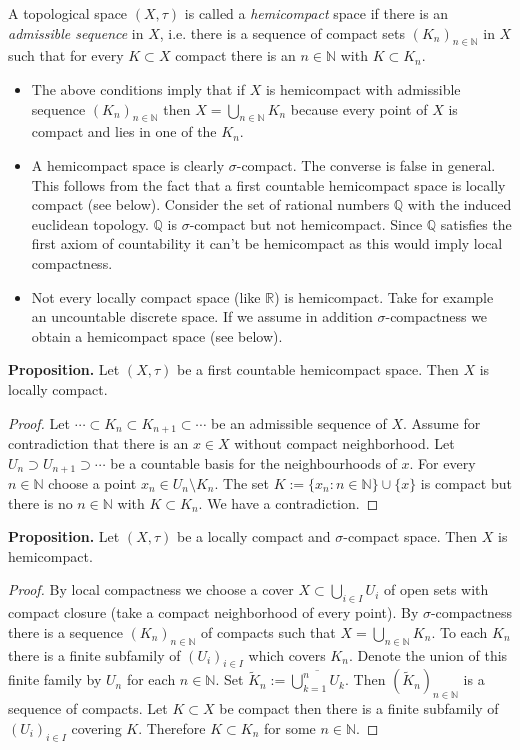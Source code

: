 \documentclass[12pt]{article}
\theoremstyle{definition}
\theoremstyle{plain}
\begin{document}
A topological space $(X, \tau)$ is called a \emph{hemicompact} space if there is an \emph{admissible sequence} in $X$, i.e. there is a sequence of compact sets $(K_n)_{n \in \mathbb{N}}$ in $X$ such that for every $K \subset X$ compact there is an $n \in \mathbb{N}$ with $K \subset K_n$.

\begin{itemize}
\item The above conditions imply that if $X$ is hemicompact with admissible sequence $(K_n)_{n \in \mathbb{N}}$ then $X = \bigcup_{n \in \mathbb{N}} K_n$ because every point of $X$ is compact and lies in one of the $K_n$.

\item A hemicompact space is clearly $\sigma$-compact. The converse is false in general. This follows from the fact that a first countable hemicompact space is locally compact (see below). Consider the set of rational numbers $\mathbb{Q}$ with the induced euclidean topology. $\mathbb{Q}$ is $\sigma$-compact but not hemicompact. Since $\mathbb{Q}$ satisfies the first axiom of countability it can't be hemicompact as this would imply local compactness.

\item Not every locally compact space (like $\mathbb{R}$) is hemicompact. Take for example an uncountable discrete space. If we assume in addition $\sigma$-compactness we obtain a hemicompact space (see below).
\end{itemize}

\textbf{Proposition.} Let $(X, \tau)$ be a first countable hemicompact space. Then $X$ is locally compact.

\begin{proof}
Let $\cdots \subset K_n \subset K_{n+1} \subset \cdots$ be an admissible sequence of $X$. 
Assume for contradiction that there is an $x \in X$ without compact neighborhood. Let $U_n \supset U_{n+1} \supset \cdots$ be a countable basis for the neighbourhoods of $x$. For every $n \in \mathbb{N}$ choose a point $x_n \in U_n \setminus K_n$. The set $K := \{x_n : n \in \mathbb{N}\} \cup \{x\}$ is compact but there is no $n \in \mathbb{N}$ with $K \subset K_n$. We have a contradiction.
\end{proof}

\textbf{Proposition.} Let $(X, \tau)$ be a locally compact and $\sigma$-compact space. Then $X$ is hemicompact. 

\begin{proof}
By local compactness we choose a cover $X \subset \bigcup_{i \in I} U_i$ of open sets with compact closure (take a compact neighborhood of every point). By $\sigma$-compactness there is a sequence $(K_n)_{n \in \mathbb{N}}$ of compacts such that $X = \bigcup_{n \in \mathbb{N}} K_n$. To each $K_n$ there is a finite subfamily of $(U_i)_{i \in I}$ which covers $K_n$.
Denote the union of this finite family by $U_n$ for each $n \in \mathbb{N}$. Set $\tilde{K}_n := \overline{\bigcup_{k=1}^n U_k}$. Then $(\tilde{K}_n)_{n \in \mathbb{N}}$ is a sequence of compacts. Let $K \subset X$ be compact then there is a finite subfamily of $(U_i)_{i \in I}$ covering $K$. Therefore $K \subset K_n$ for some $n \in \mathbb{N}$. 
\end{proof}


\end{document}

